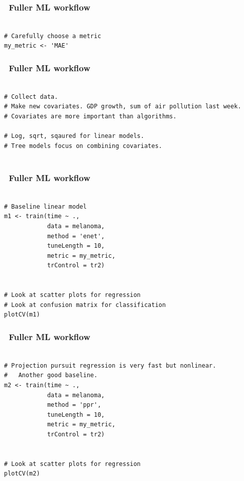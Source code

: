 \documentclass[handout, aspectratio = 169]{beamer}
\begin{document}
\begin{frame}[fragile]
\frametitle{\insertframenumber~Fuller ML workflow}
\begin{Verbatim}

# Carefully choose a metric
my_metric <- 'MAE'

\end{Verbatim}

\end{frame} 

	

\begin{frame}[fragile]
\frametitle{\insertframenumber~Fuller ML workflow}
\begin{Verbatim}

# Collect data.
# Make new covariates. GDP growth, sum of air pollution last week.
# Covariates are more important than algorithms.

# Log, sqrt, sqaured for linear models.
# Tree models focus on combining covariates.


\end{Verbatim}

\end{frame} 



\begin{frame}[fragile]
\frametitle{\insertframenumber~Fuller ML workflow}
\begin{Verbatim}

# Baseline linear model
m1 <- train(time ~ ., 
            data = melanoma,
            method = 'enet',
            tuneLength = 10,
            metric = my_metric,
            trControl = tr2)


# Look at scatter plots for regression
# Look at confusion matrix for classification
plotCV(m1)

\end{Verbatim}

\end{frame} 



\begin{frame}[fragile]
\frametitle{\insertframenumber~Fuller ML workflow}
\begin{Verbatim}

# Projection pursuit regression is very fast but nonlinear.
#   Another good baseline.
m2 <- train(time ~ ., 
            data = melanoma,
            method = 'ppr',
            tuneLength = 10,
            metric = my_metric,
            trControl = tr2)


# Look at scatter plots for regression
plotCV(m2)

\end{Verbatim}

\end{frame} 
\end{document}
